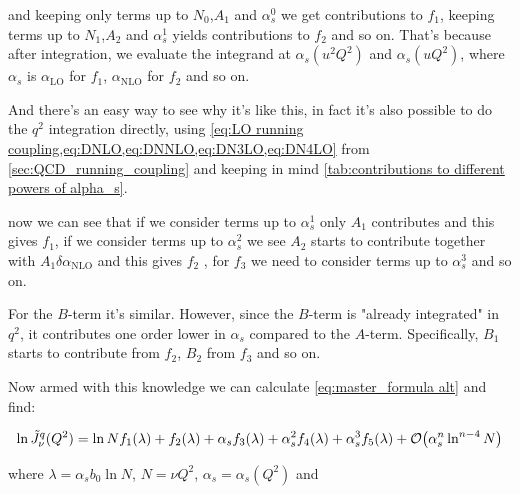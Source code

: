 \documentclass[../main.tex]{subfiles}
\begin{document}
and keeping only terms up to $N_0$,$A_1$ and $\alpha_s^0$ we get contributions to $f_1$, keeping terms up to $N_1$,$A_2$ and $\alpha_s^1$ yields contributions to $f_2$ and so on. 
That's because after integration, we evaluate the integrand at $\alpha_s(u^2 Q^2)$ and $\alpha_s(u Q^2)$, where $\alpha_s$ is $\alpha_{\text{LO}}$ for $f_1$, $\alpha_{\text{NLO}}$ for $f_2$ and so on. 

And there's an easy way to see why it's like this, in fact it's also possible to do the $q^2$ integration directly, using \cref{eq:LO running coupling,eq:DNLO,eq:DNNLO,eq:DN3LO,eq:DN4LO} from \cref{sec:QCD_running_coupling}
and keeping in mind \cref{tab:contributions to different powers of alpha_s}.


now we can see that if we consider terms up to $\alpha_s^1$ only $A_1$ contributes and this gives $f_1$, if we consider terms up to $\alpha_s^2$ we see $A_2$ starts to contribute together with $A_1  \delta\alpha_{\text{NLO}}$
and this gives $f_2$ , for $f_3$ we need to consider terms up to $\alpha_s^3$ and so on. 

For the $B$-term it's similar. However, since the $B$-term is "already integrated" in $q^2$, it contributes one order lower in $\alpha_s$ compared to the $A$-term. Specifically, $B_1$ starts to contribute from $f_2$, $B_2$ from $f_3$ and so on.  

Now armed with this knowledge we can calculate \cref{eq:master_formula alt} and find: 

\begingroup
\allowdisplaybreaks
\begin{equation}
    \ln \Tilde{J}_\nu^q(Q^2) = \ln N f_1(\lambda) + f_2(\lambda) + \alpha_s f_3(\lambda) + \alpha_s^2 f_4(\lambda) + \alpha_s^3 f_5(\lambda) + \order{\alpha_s^n \ln^{n-4}N}
\end{equation}

where $\lambda = \alpha_s b_0 \ln N$, $N=\nu Q^2$, $\alpha_s = \alpha_s(Q^2)$ and


\end{document}
